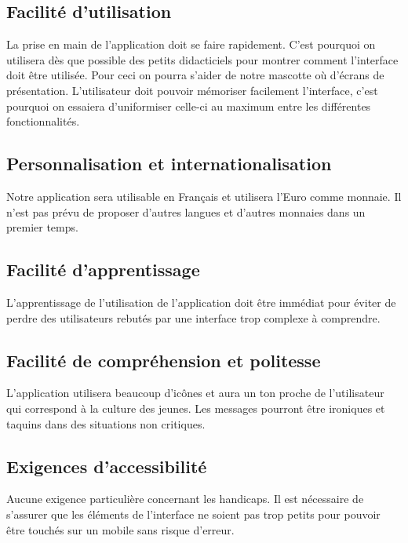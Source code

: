 \subsection{Facilité d'utilisation}
La prise en main de l'application doit se faire rapidement. C'est pourquoi on utilisera dès que possible des petits didacticiels pour montrer comment l'interface doit être utilisée. Pour ceci on pourra s'aider de notre mascotte où d'écrans de présentation. L'utilisateur doit pouvoir mémoriser facilement l'interface, c'est pourquoi on essaiera d'uniformiser celle-ci au maximum entre les différentes fonctionnalités.

\subsection{Personnalisation et internationalisation}
Notre application sera utilisable en Français et utilisera l'Euro comme monnaie. Il n'est pas prévu de proposer d'autres langues et d'autres monnaies dans un premier temps.

\subsection{Facilité d'apprentissage}
L'apprentissage de l'utilisation de l'application doit être immédiat pour éviter de perdre des utilisateurs rebutés par une interface trop complexe à comprendre.

\subsection{Facilité de compréhension et politesse}
L'application utilisera beaucoup d'icônes et aura un ton proche de l'utilisateur qui correspond à la culture des jeunes. Les messages pourront être ironiques et taquins dans des situations non critiques.

\subsection{Exigences d'accessibilité}
Aucune exigence particulière concernant les handicaps. Il est nécessaire de s'assurer que les éléments de l'interface ne soient pas trop petits pour pouvoir être touchés sur un mobile sans risque d'erreur.